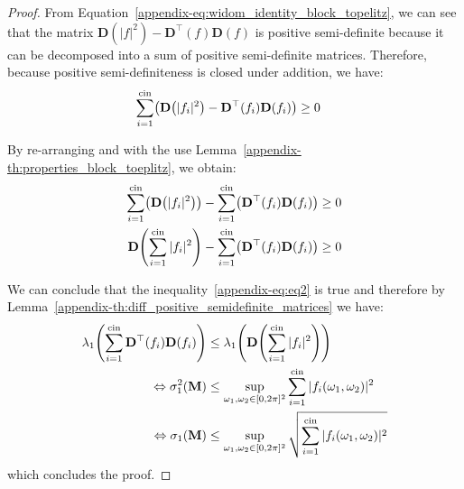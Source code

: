 \begin{proof}
From Equation~\ref{appendix-eq:widom_identity_block_topelitz}, we can see that the matrix $\mathbf{D}(|f|^2) - \mathbf{D}^{\top}(f)\mathbf{D}(f)$
is positive semi-definite because it can be decomposed into a sum of positive semi-definite matrices.
Therefore, because positive semi-definiteness is closed under addition, we have:
\begin{align}
    \sum_{i=1}^{\cin} \leftmat \mathbf{D} \left( |f_i|^2 \right) - \mathbf{D}^{\top} \left(f_i \right) \mathbf{D} (f_i) \rightmat &\geq 0
\end{align}

By re-arranging and with the use Lemma~\ref{appendix-th:properties_block_toeplitz}, we obtain:
\begin{align}
   \sum_{i=1}^{\cin} \leftmat \mathbf{D} \left( |f_i|^2 \right) \rightmat - \sum_{i=1}^{\cin} \leftmat \mathbf{D}^{\top} \left(f_i \right) \mathbf{D} (f_i) \rightmat &\geq 0 \\
    \mathbf{D} \left( \sum_{i=1}^{\cin} |f_i|^2 \right) - \sum_{i=1}^{\cin} \leftmat \mathbf{D}^{\top} \left(f_i \right) \mathbf{D} (f_i) \rightmat &\geq 0
\end{align}


We can conclude that the inequality~\ref{appendix-eq:eq2} is true and therefore by Lemma~\ref{appendix-th:diff_positive_semidefinite_matrices} we have:
\begin{align}
    \lambda_1 \left( \sum_{i=1}^{\cin} \mathbf{D}^{\top} \left(f_i \right) \mathbf{D} (f_i) \right) &\leq \lambda_1 \left( \mathbf{D} \left( \sum_{i=1}^{\cin} |f_i|^2 \right) \right) \\
    \Leftrightarrow \sigma_1^2 \left( \mathbf{M} \right) &\leq \sup_{\omega_1, \omega_2 \in [0, 2\pi]^2} \sum_{i=1}^{\cin} |f_i(\omega_1, \omega_2)|^2 \\
    \Leftrightarrow \sigma_1 \left( \mathbf{M} \right) &\leq \sup_{\omega_1, \omega_2 \in [0, 2\pi]^2} \sqrt{ \sum_{i=1}^{\cin} |f_i(\omega_1, \omega_2)|^2 }
\end{align}
which concludes the proof. 
\end{proof}






